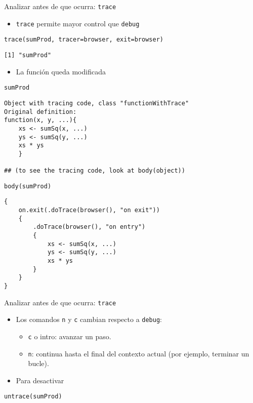 \documentclass[xcolor={usenames,svgnames,dvipsnames}]{beamer}
\begin{document}
\begin{frame}[fragile,label=sec-3-3]{Analizar antes de que ocurra: \texttt{trace}}
 \begin{itemize}
\item \texttt{trace} permite mayor control que \texttt{debug}
\end{itemize}
\lstset{language=R,numbers=none}
\begin{lstlisting}
trace(sumProd, tracer=browser, exit=browser)
\end{lstlisting}

\begin{verbatim}
[1] "sumProd"
\end{verbatim}

\begin{itemize}
\item La función queda modificada
\end{itemize}
\lstset{language=R,numbers=none}
\begin{lstlisting}
sumProd
\end{lstlisting}

\begin{verbatim}
Object with tracing code, class "functionWithTrace"
Original definition: 
function(x, y, ...){
    xs <- sumSq(x, ...)
    ys <- sumSq(y, ...)
    xs * ys
    }

## (to see the tracing code, look at body(object))
\end{verbatim}

\lstset{language=R,numbers=none}
\begin{lstlisting}
body(sumProd)
\end{lstlisting}

\begin{verbatim}
{
    on.exit(.doTrace(browser(), "on exit"))
    {
        .doTrace(browser(), "on entry")
        {
            xs <- sumSq(x, ...)
            ys <- sumSq(y, ...)
            xs * ys
        }
    }
}
\end{verbatim}
\end{frame}
\begin{frame}[fragile,label=sec-3-4]{Analizar antes de que ocurra: \texttt{trace}}
 \begin{itemize}
\item Los comandos \texttt{n} y \texttt{c} cambian respecto a \texttt{debug}:
\begin{itemize}
\item \texttt{c} o intro: avanzar un paso.
\item \texttt{n}: continua hasta el final del contexto actual (por ejemplo,
terminar un bucle).
\end{itemize}
\item Para desactivar
\end{itemize}
\lstset{language=R,numbers=none}
\begin{lstlisting}
untrace(sumProd)
\end{lstlisting}
\end{frame}
\end{document}
